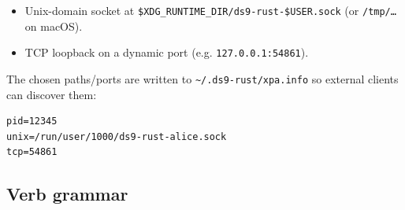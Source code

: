 \documentclass[11pt,a4paper]{article}
\begin{document}
\begin{itemize}
\item Unix-domain socket at
      \texttt{\$XDG\_RUNTIME\_DIR/ds9-rust-\$USER.sock}
      (or \texttt{/tmp/\dots} on macOS).
\item TCP loopback on a dynamic port (e.g. \texttt{127.0.0.1:54861}).
\end{itemize}

The chosen paths/ports are written to
\texttt{\textasciitilde/.ds9-rust/xpa.info} so external clients can
discover them:

\begin{lstlisting}
pid=12345
unix=/run/user/1000/ds9-rust-alice.sock
tcp=54861
\end{lstlisting}

\subsection{Verb grammar}
\end{document}
